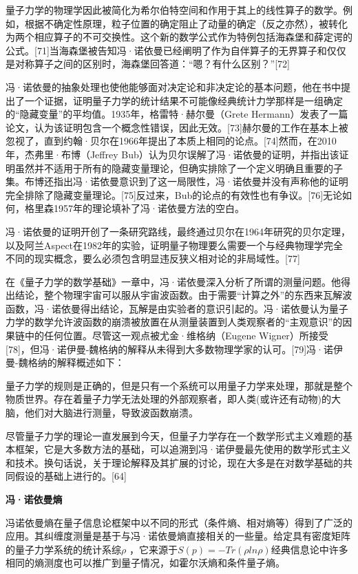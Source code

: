 量子力学的物理学因此被简化为希尔伯特空间和作用于其上的线性算子的数学。例如，根据不确定性原理，粒子位置的确定阻止了动量的确定（反之亦然），被转化为两个相应算子的不可交换性。这个新的数学公式作为特例包括海森堡和薛定谔的公式。[71]当海森堡被告知冯·诺依曼已经阐明了作为自伴算子的无界算子和仅仅是对称算子之间的区别时，海森堡回答道：“嗯？有什么区别？”[72]

冯·诺依曼的抽象处理也使他能够面对决定论和非决定论的基本问题，他在书中提出了一个证据，证明量子力学的统计结果不可能像经典统计力学那样是一组确定的“隐藏变量”的平均值。1935年，格雷特·赫尔曼（Grete Hermann）发表了一篇论文，认为该证明包含一个概念性错误，因此无效。[73]赫尔曼的工作在基本上被忽视了，直到约翰·贝尔在1966年提出了本质上相同的论点。[74]然而，在2010年，杰弗里·布博（Jeffrey Bub）认为贝尔误解了冯·诺依曼的证明，并指出该证明虽然并不适用于所有的隐藏变量理论，但确实排除了一个定义明确且重要的子集。布博还指出冯·诺依曼意识到了这一局限性，冯·诺依曼并没有声称他的证明完全排除了隐藏变量理论。[75]反过来，Bub的论点的有效性也有争议。[76]无论如何，格里森1957年的理论填补了冯·诺依曼方法的空白。

冯·诺依曼的证明开创了一条研究路线，最终通过贝尔在1964年研究的贝尔定理，以及阿兰Aspect在1982年的实验，证明量子物理要么需要一个与经典物理学完全不同的现实概念，要么必须包含明显违反狭义相对论的非局域性。[77]

在《量子力学的数学基础》一章中，冯·诺依曼深入分析了所谓的测量问题。他得出结论，整个物理宇宙可以服从宇宙波函数。由于需要“计算之外”的东西来瓦解波函数，冯·诺依曼得出结论，瓦解是由实验者的意识引起的。冯·诺依曼认为量子力学的数学允许波函数的崩溃被放置在从测量装置到人类观察者的“主观意识”的因果链中的任何位置。尽管这一观点被尤金·维格纳（Eugene Wigner）所接受[78]，但冯·诺伊曼-魏格纳的解释从未得到大多数物理学家的认可。[79]冯·诺伊曼-魏格纳的解释概述如下：

量子力学的规则是正确的，但是只有一个系统可以用量子力学来处理，那就是整个物质世界。存在着量子力学无法处理的外部观察者，即人类(或许还有动物)的大脑，他们对大脑进行测量，导致波函数崩溃。

尽管量子力学的理论一直发展到今天，但量子力学存在一个数学形式主义难题的基本框架，它是大多数方法的基础，可以追溯到冯·诺伊曼最先使用的数学形式主义和技术。换句话说，关于理论解释及其扩展的讨论，现在大多是在对数学基础的共同假设的基础上进行的。[64]

\textbf{冯·诺依曼熵}

冯诺依曼熵在量子信息论框架中以不同的形式（条件熵、相对熵等）得到了广泛的应用。其纠缠度测量是基于与冯·诺依曼熵直接相关的一些量。给定具有密度矩阵的量子力学系统的统计系综$\rho$ ，它来源于$S(p)=-Tr(\rho ln\rho)$经典信息论中许多相同的熵测度也可以推广到量子情况，如霍尔沃熵和条件量子熵。

